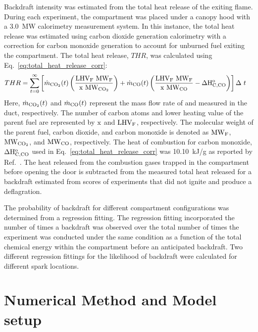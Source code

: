\documentclass[12pt,letterpaper]{article}
\begin{document}
\begin{flushleft}
Backdraft intensity was estimated from the total heat release of the exiting flame. During each experiment, the compartment was placed under a canopy hood with a 3.0~MW calorimetry measurement system. In this instance, the total heat release was estimated using carbon dioxide generation calorimetry with a correction for carbon monoxide generation to account for unburned fuel exiting the compartment. The total heat release, $THR$, was calculated using Eq.~\ref{eq:total_heat_release_corr}:
\begin{equation}
\begin{split}
\label{eq:total_heat_release_corr}
THR&=\sum_{t=0}^{\infty} \left[ \dot{m}_{\rm{CO_2}}(t)\left(\frac{\rm{LHV_F}~\rm{MW_F}}{\rm{x}~\rm{MW_{CO_2}}}\right)+\dot{m}_{\rm{CO}}(t)\left(\frac{\rm{LHV_F}~\rm{MW_F}}{\rm{x}~\rm{MW_{CO}}}-\Delta\rm{H}^{\rm{o}}_{C,CO}\right) \right] \Delta~t
\end{split}
\end{equation}
Here, $\dot{m}_{\rm{CO_2}}(t)$ and $\dot{m}_{\rm{CO}}(t)$ represent the mass flow rate of  and  measured in the duct, respectively. The number of carbon atoms and lower heating value of the parent fuel are represented by $\rm{x}$ and $\rm{LHV_F}$, respectively. The molecular weight of the parent fuel, carbon dioxide, and carbon monoxide is denoted as $\rm{MW_F}$, $\rm{MW_{CO_2}}$, and $\rm{MW_{CO}}$, respectively. The heat of combustion for carbon monoxide, $\Delta \rm{H}^{\rm{o}}_{C,CO}$ used in Eq.~\ref{eq:total_heat_release_corr} was 10.10~kJ/g as reported by Ref.~\cite{Hurley2016}. The heat released from the combustion gases trapped in the compartment before opening the door is subtracted from the measured total heat released for a backdraft estimated from scores of experiments that did not ignite and produce a deflagration.

The probability of backdraft for different compartment configurations was determined from a regression fitting. The regression fitting incorporated the number of times a backdraft was observed over the total number of times the experiment was conducted under the same condition as a function of the total chemical energy within the compartment before an anticipated backdraft. Two different regression fittings for the likelihood of backdraft were calculated for different spark locations. 

\section{Numerical Method and Model setup} 
\label{sec:FDS_setup}


\end{flushleft}
\end{document}
